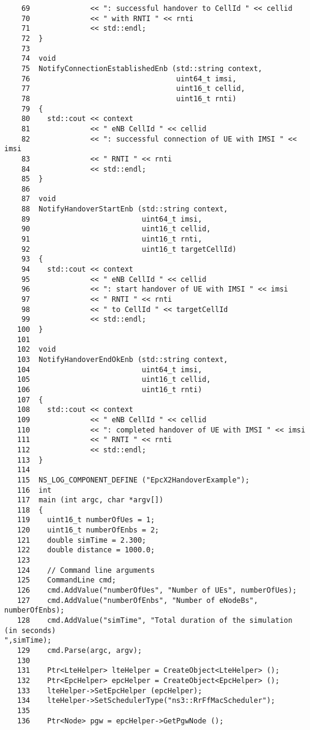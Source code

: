 \begin{verbatim}
    69              << ": successful handover to CellId " << cellid 
    70              << " with RNTI " << rnti 
    71              << std::endl;
    72  }
    73
    74  void 
    75  NotifyConnectionEstablishedEnb (std::string context, 
    76                                  uint64_t imsi, 
    77                                  uint16_t cellid, 
    78                                  uint16_t rnti)
    79  {
    80    std::cout << context 
    81              << " eNB CellId " << cellid 
    82              << ": successful connection of UE with IMSI " << imsi 
    83              << " RNTI " << rnti 
    84              << std::endl;
    85  }
    86
    87  void 
    88  NotifyHandoverStartEnb (std::string context, 
    89                          uint64_t imsi, 
    90                          uint16_t cellid, 
    91                          uint16_t rnti, 
    92                          uint16_t targetCellId)
    93  {
    94    std::cout << context 
    95              << " eNB CellId " << cellid 
    96              << ": start handover of UE with IMSI " << imsi 
    97              << " RNTI " << rnti 
    98              << " to CellId " << targetCellId 
    99              << std::endl;
   100  }
   101
   102  void 
   103  NotifyHandoverEndOkEnb (std::string context, 
   104                          uint64_t imsi, 
   105                          uint16_t cellid, 
   106                          uint16_t rnti)
   107  {
   108    std::cout << context 
   109              << " eNB CellId " << cellid 
   110              << ": completed handover of UE with IMSI " << imsi 
   111              << " RNTI " << rnti 
   112              << std::endl;
   113  }
   114   
   115  NS_LOG_COMPONENT_DEFINE ("EpcX2HandoverExample");
   116  int
   117  main (int argc, char *argv[])
   118  {
   119    uint16_t numberOfUes = 1;
   120    uint16_t numberOfEnbs = 2;
   121    double simTime = 2.300;
   122    double distance = 1000.0;
   123
   124    // Command line arguments
   125    CommandLine cmd;
   126    cmd.AddValue("numberOfUes", "Number of UEs", numberOfUes);
   127    cmd.AddValue("numberOfEnbs", "Number of eNodeBs", numberOfEnbs);
   128    cmd.AddValue("simTime", "Total duration of the simulation (in seconds)
",simTime);
   129    cmd.Parse(argc, argv);
   130
   131    Ptr<LteHelper> lteHelper = CreateObject<LteHelper> ();
   132    Ptr<EpcHelper> epcHelper = CreateObject<EpcHelper> ();
   133    lteHelper->SetEpcHelper (epcHelper);
   134    lteHelper->SetSchedulerType("ns3::RrFfMacScheduler");
   135
   136    Ptr<Node> pgw = epcHelper->GetPgwNode ();

\end{verbatim}

